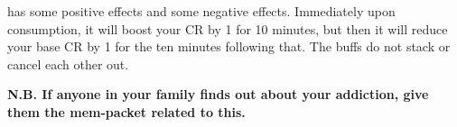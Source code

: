 \documentclass[green]{NeptuneBall}
\begin{document}
\iDrug{} has some positive effects and some negative effects. Immediately upon consumption, it will boost your CR by 1 for 10 minutes, but then it will reduce your base CR by 1 for the ten minutes following that. The buffs do not stack or cancel each other out.

{\bf N.B. If anyone in your family finds out about your addiction, give them the mem-packet related to this.}
\end{document}
